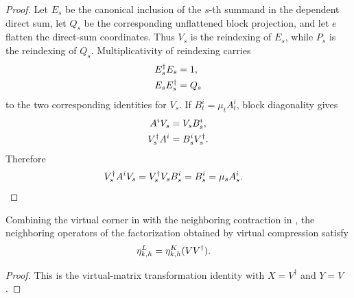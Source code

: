 \begin{proof}
    \leanok
    Let $E_s$ be the canonical inclusion of the $s$-th summand in the
    dependent direct sum, let $Q_s$ be the corresponding unflattened block
    projection, and let $e$ flatten the direct-sum coordinates.  Thus $V_s$
    is the reindexing of $E_s$, while $P_s$ is the reindexing of $Q_s$.
    Multiplicativity of reindexing carries
    \begin{align}
        E_s^\dagger E_s & =1, \notag \\
        E_sE_s^\dagger  & =Q_s
        \notag
    \end{align}
    to the two corresponding identities for $V_s$.  If
    $B_t^i=\mu_tA_t^i$, block diagonality gives
    \begin{align}
        A^iV_s          & =V_sB_s^i, \notag  \\
        V_s^\dagger A^i & =B_s^iV_s^\dagger.
        \notag
    \end{align}
    Therefore
    \begin{align}
        V_s^\dagger A^iV_s
         & =V_s^\dagger V_sB_s^i
        =B_s^i
        =\mu_sA_s^i.
        \notag
    \end{align}
\end{proof}

\begin{lemma}
    \label{thm:mpdo_physical_sector_factorization_virtual_compression_neighbor}
    \leanok
    Combining the virtual corner in
    \cite[Section~2.3, lines~195--219]{Cirac2016MPDO_arXiv} with the
    neighboring contraction in
    \cite[Appendix~C.2, lines~1441--1450]{Cirac2016MPDO_arXiv}, the neighboring
    operators of the factorization obtained by virtual compression satisfy
    \begin{align}
        \eta^L_{k,h}
         & =\eta^K_{k,h}(VV^\dagger).
        \notag
    \end{align}
\end{lemma}

\begin{proof}
    \leanok
    This is the virtual-matrix transformation identity with $X=V^\dagger$ and
    $Y=V$.
\end{proof}

